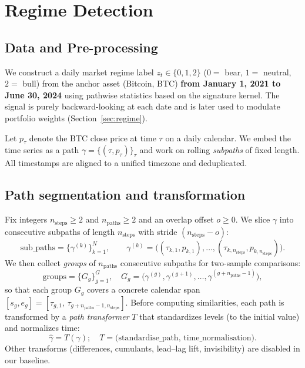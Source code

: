 \section{Regime Detection}\label{sec:regime-detection}




\subsection{Data and Pre-processing}
We construct a daily market regime label $z_t\in\{0,1,2\}$ (\(0=\) bear, \(1=\) neutral, \(2=\) bull) from the anchor asset (Bitcoin, BTC) \textbf{from January 1, 2021
to June 30, 2024} using pathwise statistics based on the signature kernel. The signal is purely backward-looking at each date and is later used to modulate portfolio weights (Section~\ref{sec:regime}).

Let $p_\tau$ denote the BTC close price at time $\tau$ on a daily calendar.
We embed the time series as a path $\gamma=\{(\tau,p_\tau)\}_\tau$ and work on rolling \emph{subpaths} of fixed length.
All timestamps are aligned to a unified timezone and deduplicated.

\subsection{Path segmentation and transformation}\label{sec:regime:seg}
Fix integers $n_{\text{steps}}\ge 2$ and $n_{\text{paths}}\ge 2$ and an overlap offset $o\ge 0$.
We slice $\gamma$ into consecutive subpaths of length $n_{\text{steps}}$ with stride $(n_{\text{steps}}-o)$:
\[
\textstyle
\mathrm{sub\_paths}
=\big\{\gamma^{(k)}\big\}_{k=1}^{N},\qquad
\gamma^{(k)}=\big((\tau_{k,1},p_{k,1}),\ldots,(\tau_{k,n_{\text{steps}}},p_{k,n_{\text{steps}}})\big).
\]
We then collect \emph{groups} of $n_{\text{paths}}$ consecutive subpaths for two-sample comparisons:
\[
\textstyle
\mathrm{groups}=\big\{G_g\big\}_{g=1}^{G},\quad
G_g=\big(\gamma^{(g)},\gamma^{(g+1)},\ldots,\gamma^{(g+n_{\text{paths}}-1)}\big),
\]
so that each group $G_g$ covers a concrete calendar span
$[s_g,e_g]=[\tau_{g,1},\,\tau_{g+n_{\text{paths}}-1,n_{\text{steps}}}]$.
Before computing similarities, each path is transformed by a \emph{path transformer} \(T\) that standardizes levels (to the initial value) and normalizes time:
\[
\widehat\gamma=T(\gamma);\quad
T=\text{(standardise\_path, time\_normalisation)}.
\]
Other transforms (differences, cumulants, lead--lag lift, invisibility) are disabled in our baseline.

